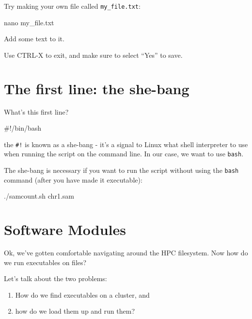 \documentclass[
  letterpaper,
  DIV=11,
  numbers=noendperiod]{scrreprt}
\newenvironment{Shaded}{\begin{snugshade}}{\end{snugshade}}
\newcommand{\CommentTok}[1]{\textcolor[rgb]{0.37,0.37,0.37}{#1}}
\newcommand{\ExtensionTok}[1]{\textcolor[rgb]{0.00,0.23,0.31}{#1}}
\newcommand{\FunctionTok}[1]{\textcolor[rgb]{0.28,0.35,0.67}{#1}}
\newcommand{\NormalTok}[1]{\textcolor[rgb]{0.00,0.23,0.31}{#1}}
\providecommand{\tightlist}{%
  \setlength{\itemsep}{0pt}\setlength{\parskip}{0pt}}
\begin{document}
Try making your own file called \texttt{my\_file.txt}:

\begin{Shaded}
\begin{Highlighting}[]
\FunctionTok{nano}\NormalTok{ my\_file.txt}
\end{Highlighting}
\end{Shaded}

Add some text to it.

Use CTRL-X to exit, and make sure to select ``Yes'' to save.

\section{The first line: the she-bang}\label{sec-shebang}

What's this first line?

\begin{Shaded}
\begin{Highlighting}[]
\CommentTok{\#!/bin/bash}
\end{Highlighting}
\end{Shaded}

the \texttt{\#!} is known as a she-bang - it's a signal to Linux what
shell interpreter to use when running the script on the command line. In
our case, we want to use \texttt{bash}.

The she-bang is necessary if you want to run the script without using
the \texttt{bash} command (after you have made it executable):

\begin{Shaded}
\begin{Highlighting}[]
\ExtensionTok{./samcount.sh}\NormalTok{ chr1.sam}
\end{Highlighting}
\end{Shaded}

\section{Software Modules}\label{sec-modules}

Ok, we've gotten comfortable navigating around the HPC filesystem. Now
how do we run executables on files?

Let's talk about the two problems:

\begin{enumerate}
\def\labelenumi{\arabic{enumi})}
\tightlist
\item
  How do we find executables on a cluster, and
\item
  how do we load them up and run them?
\end{enumerate}
\end{document}
